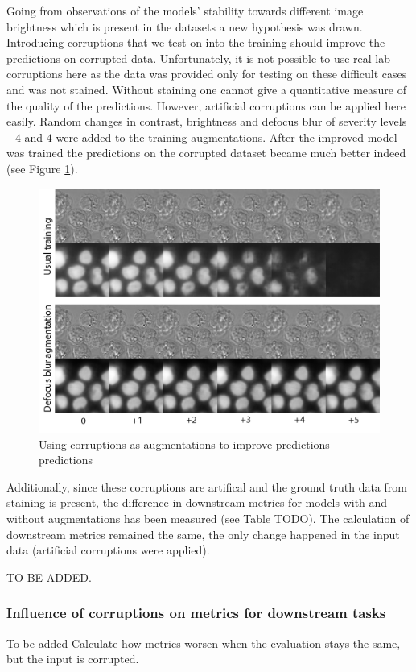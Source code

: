 Going from observations of the models' stability towards different image brightness which is present in the datasets a new hypothesis was drawn. Introducing corruptions that we test on into the training should improve the predictions on corrupted data. Unfortunately, it is not possible to use real lab corruptions here as the data was provided only for testing on these difficult cases and was not stained. Without staining one cannot give a quantitative measure of the quality of the predictions. However, artificial corruptions can be applied here easily. Random changes in contrast, brightness and defocus blur of severity levels $-4$ and $4$ were added to the training augmentations. After the improved model was trained the predictions on the corrupted dataset became much better indeed (see Figure \ref{fig:augments-help}).

\begin{figure}[htb]
	\begin{center}
		\includegraphics[width=0.4\linewidth]{bilder/stability/augments-help.png}
		\caption{Using corruptions as augmentations to improve predictions predictions}\label{fig:augments-help}
	\end{center}
\end{figure}

Additionally, since these corruptions are artifical and the ground truth data from staining is present, the difference in downstream metrics for models with and without augmentations has been measured (see Table TODO). The calculation of downstream metrics remained the same, the only change happened in the input data (artificial corruptions were applied).

TO BE ADDED.

\subsubsection{Influence of corruptions on metrics for downstream tasks}
To be added
Calculate how metrics worsen when the evaluation stays the same, but the input is corrupted.